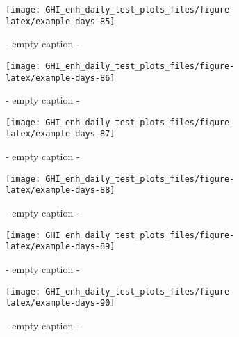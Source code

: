 \documentclass[
  10pt,
  a4paper,oneside]{article}
\begin{document}
\begin{figure}[H]

{\centering \texttt{[image: GHI\_enh\_daily\_test\_plots\_files/figure-latex/example-days-85]} 

}

\caption{ - empty caption - }\label{fig:example-days-85}
\end{figure}

\begin{figure}[H]

{\centering \texttt{[image: GHI\_enh\_daily\_test\_plots\_files/figure-latex/example-days-86]} 

}

\caption{ - empty caption - }\label{fig:example-days-86}
\end{figure}

\begin{figure}[H]

{\centering \texttt{[image: GHI\_enh\_daily\_test\_plots\_files/figure-latex/example-days-87]} 

}

\caption{ - empty caption - }\label{fig:example-days-87}
\end{figure}

\begin{figure}[H]

{\centering \texttt{[image: GHI\_enh\_daily\_test\_plots\_files/figure-latex/example-days-88]} 

}

\caption{ - empty caption - }\label{fig:example-days-88}
\end{figure}

\begin{figure}[H]

{\centering \texttt{[image: GHI\_enh\_daily\_test\_plots\_files/figure-latex/example-days-89]} 

}

\caption{ - empty caption - }\label{fig:example-days-89}
\end{figure}

\begin{figure}[H]

{\centering \texttt{[image: GHI\_enh\_daily\_test\_plots\_files/figure-latex/example-days-90]} 

}

\caption{ - empty caption - }\label{fig:example-days-90}
\end{figure}
\end{document}
